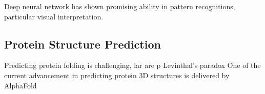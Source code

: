 Deep neural network has shown promising ability in pattern recognitions, particular visual interpretation.
\par 

\subsection{Protein Structure Prediction}
Predicting protein folding is challenging, lar are p Levinthal's paradox One of the current advancement in predicting protein 3D structures is delivered by AlphaFold